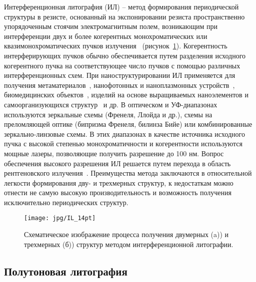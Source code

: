 Интерференционная литография (ИЛ) -- метод формирования периодической структуры в резисте, основанный на экспонировании резиста пространственно упорядоченным стоячим электромагнитным полем, возникающим при интерференции двух и более когерентных монохроматических или квазимонохроматических пучков излучения~\cite{IL_general} (рисунок~\ref{fig:IL}). Когерентность интерферирующих пучков обычно обеспечивается путем разделения исходного когерентного пучка на соответствующее число пучков с помощью различных интерференционных схем. При наноструктурировании ИЛ применяется для получения  метаматериалов~\cite{IL_metamaterials}, нанофотонных и наноплазмонных устройств~\cite{IL_nanophotonics}, биомедицинских объектов~\cite{IL_biomedical}, изделий на основе выращиваемых наноэлементов и самоорганизующихся структур~\cite{IL_self-assembly} и др.
В оптическом и УФ-диапазонах используются зеркальные схемы (Френеля, Ллойда и др.), схемы на преломляющей оптике (бипризма Френеля, билинза Бийе) или комбинированные зеркально-линзовые схемы. В этих диапазонах в качестве источника исходного пучка с высокой степенью монохроматичности и когерентности используются мощные лазеры, позволяющие получить разрешение до 100 нм. Вопрос обеспечения высокого разрешения ИЛ решается путем перехода в область рентгеновского излучения~\cite{IL_X-ray}. Преимущества метода заключаются в относительной легкости формирования дву- и трехмерных структур, к недостаткам можно отнести не самую высокую производительность и возможность получения исключительно периодических структур.

\begin{figure}
	\centering
	\texttt{[image: jpg/IL\_14pt]}
	\caption{Схематическое изображение процесса получения двумерных (a)) и трехмерных (б)) структур методом интерференционной литографии.}
	\label{fig:IL}
\end{figure}


\subsection{Полутоновая литография}

